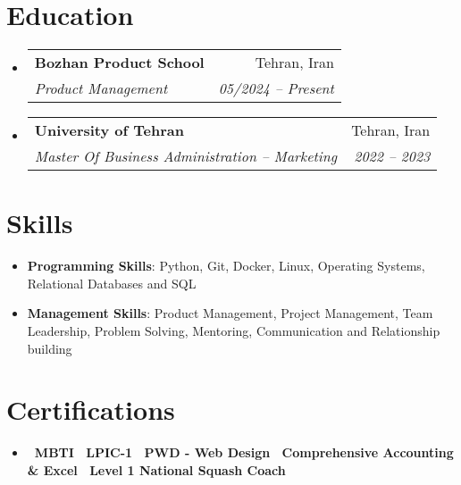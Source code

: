 \documentclass[letter paper,10pt]{article}
\makeatletter
\newcommand{\resumeItem}[1]{\item\small{#1}}
\newcommand{\resumeSubheading}[4]{
\vspace{-0.5pt}\item
  \begin{tabular*}{0.97\textwidth}[t]{l@{\extracolsep{\fill}}r}
    \textbf{#1} & #2 \\
    \textit{#3} & \textit{#4} \\
  \end{tabular*}\vspace{-7pt}
}
\newcommand{\resumeSubHeadingList}{\begin{itemize}[leftmargin=0.15in, label={}]}
\newcommand{\resumeSubHeadingListEnd}{\end{itemize}}
\makeatother
\begin{document}
\section{Education}
\resumeSubHeadingList
  \resumeSubheading
      {Bozhan Product School}{Tehran, Iran}
      {Product Management}{05/2024 -- Present}
  \resumeSubheading
      {University of Tehran}{Tehran, Iran}
      {Master Of Business Administration -- Marketing}{2022 -- 2023}
\resumeSubHeadingListEnd

\section{Skills}
\resumeSubHeadingList
  \resumeItem{\textbf{Programming Skills}: Python, Git, Docker, Linux, Operating Systems, Relational Databases and SQL}
  \resumeItem{\textbf{Management Skills}: Product Management, Project Management, Team Leadership,       Problem Solving, Mentoring, Communication and Relationship building}
\resumeSubHeadingListEnd

\section{Certifications}
\resumeSubHeadingList
  \resumeItem{\textbf{\textbullet\ MBTI \textbullet\ LPIC-1 \textbullet\ PWD - Web Design \textbullet\ Comprehensive Accounting \& Excel \textbullet\ Level 1 National Squash Coach }}
\resumeSubHeadingListEnd
\end{document}
